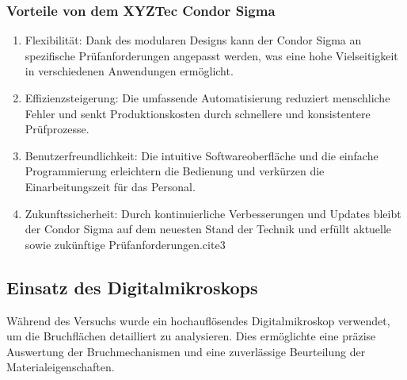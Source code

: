 \subsubsection{Vorteile von dem XYZTec Condor Sigma}
\begin{enumerate}
    \item Flexibilität: Dank des modularen Designs kann der Condor Sigma an spezifische Prüfanforderungen angepasst werden, was eine hohe Vielseitigkeit in verschiedenen Anwendungen ermöglicht.
    \item Effizienzsteigerung: Die umfassende Automatisierung reduziert menschliche Fehler und senkt Produktionskosten durch schnellere und konsistentere Prüfprozesse.
    \item Benutzerfreundlichkeit: Die intuitive Softwareoberfläche und die einfache Programmierung erleichtern die Bedienung und verkürzen die Einarbeitungszeit für das Personal.
    \item Zukunftssicherheit: Durch kontinuierliche Verbesserungen und Updates bleibt der Condor Sigma auf dem neuesten Stand der Technik und erfüllt aktuelle sowie zukünftige Prüfanforderungen.cite{3}
\end{enumerate}
\subsection{Einsatz des Digitalmikroskops}
Während des Versuchs wurde ein hochauflösendes Digitalmikroskop verwendet, um die Bruchflächen detailliert zu analysieren. Dies ermöglichte eine präzise Auswertung der Bruchmechanismen und eine zuverlässige Beurteilung der Materialeigenschaften.
